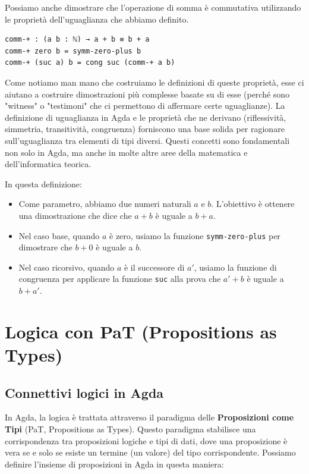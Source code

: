 \documentclass[a4paper]{article}
\theoremstyle{definition}
\theoremstyle{remark}
\begin{document}
Possiamo anche dimostrare che l'operazione di somma è commutativa utilizzando le proprietà dell'uguaglianza che abbiamo definito.
\begin{verbatim}
comm-+ : (a b : ℕ) → a + b ≡ b + a
comm-+ zero b = symm-zero-plus b
comm-+ (suc a) b = cong suc (comm-+ a b)
\end{verbatim}
\begin{Observation}{}{}
  Come notiamo man mano che costruiamo le definizioni di queste proprietà, 
  esse ci aiutano a costruire dimostrazioni più complesse basate su di esse (perché
  sono "witness" o "testimoni" che ci permettono di affermare certe uguaglianze). 
  La definizione di uguaglianza in Agda e le proprietà che ne derivano
  (riflessività, simmetria, transitività, congruenza) forniscono una base solida
  per ragionare sull'uguaglianza tra elementi di tipi diversi.
  Questi concetti sono fondamentali non solo in Agda, ma anche in molte altre aree della matematica e dell'informatica teorica.
\end{Observation}
In questa definizione:
\begin{itemize}
  \item Come parametro, abbiamo due numeri naturali \( a \) e \( b \). L'obiettivo è ottenere una dimostrazione
  che dice che \( a + b \) è uguale a \( b + a \).
  \item Nel caso base, quando \( a \) è zero, usiamo la funzione \texttt{symm-zero-plus} per dimostrare che \( b + 0 \) è uguale a \( b \).
  \item Nel caso ricorsivo, quando \( a \) è il successore di \( a' \), usiamo la funzione di congruenza per applicare la funzione \texttt{suc} alla prova che \( a' + b \) è uguale a \( b + a' \).
\end{itemize}

\pagebreak

\section{Logica con PaT (Propositions as Types)}

\subsection{Connettivi logici in Agda}

In Agda, la logica è trattata attraverso il paradigma delle \textbf{Proposizioni come Tipi} (PaT, Propositions as Types).
Questo paradigma stabilisce una corrispondenza tra proposizioni logiche e tipi di dati,
dove una proposizione è vera se e solo se esiste un termine (un valore) del tipo corrispondente.
Possiamo definire l'insieme di proposizioni in Agda in questa maniera:
\end{document}
